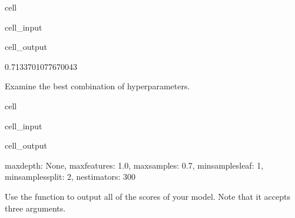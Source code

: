 \documentclass[letterpaper,10pt,english]{sphinxmanual}
\begin{document}
\begin{sphinxuseclass}{cell}
\begin{sphinxuseclass}{cell_input}
\begin{sphinxVerbatim}[commandchars=\\\{\}]
\end{sphinxVerbatim}

\end{sphinxuseclass}
\begin{sphinxuseclass}{cell_output}
\begin{sphinxVerbatim}[commandchars=\\\{\}]
0.7133701077670043
\end{sphinxVerbatim}

\end{sphinxuseclass}
\end{sphinxuseclass}
\sphinxAtStartPar
Examine the best combination of hyperparameters.

\begin{sphinxuseclass}{cell}
\begin{sphinxuseclass}{cell_input}
\begin{sphinxVerbatim}[commandchars=\\\{\}]
\end{sphinxVerbatim}

\end{sphinxuseclass}
\begin{sphinxuseclass}{cell_output}
\begin{sphinxVerbatim}[commandchars=\\\{\}]
\PYGZob{}\PYGZsq{}max\PYGZus{}depth\PYGZsq{}: None,
 \PYGZsq{}max\PYGZus{}features\PYGZsq{}: 1.0,
 \PYGZsq{}max\PYGZus{}samples\PYGZsq{}: 0.7,
 \PYGZsq{}min\PYGZus{}samples\PYGZus{}leaf\PYGZsq{}: 1,
 \PYGZsq{}min\PYGZus{}samples\PYGZus{}split\PYGZsq{}: 2,
 \PYGZsq{}n\PYGZus{}estimators\PYGZsq{}: 300\PYGZcb{}
\end{sphinxVerbatim}

\end{sphinxuseclass}
\end{sphinxuseclass}
\sphinxAtStartPar
Use the  function to output all of the scores of your model. Note that it accepts three arguments.
\end{document}
